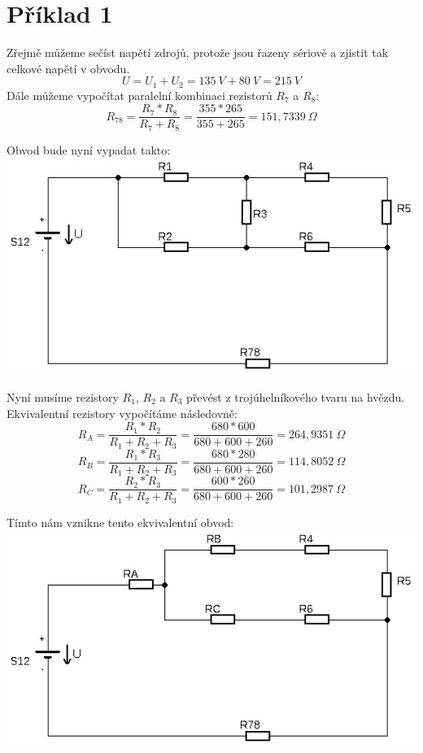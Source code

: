 \section{Příklad 1}

Zřejmě můžeme sečíst napětí zdrojů, protože jsou řazeny sériově a zjistit tak celkové napětí v obvodu.
{\large$$U = U_1 + U_2 = 135\:V + 80\:V = 215\:V$$}
Dále můžeme vypočítat paralelní kombinaci rezistorů $R_7$ a $R_8$: 
{\large$$R_{78} = \frac{R_7*R_8}{R_7 + R_8} = \frac{355*265}{355+265} = 151,7339\:\Omega$$}

Obvod bude nyní vypadat takto: \\

\includegraphics[totalheight=6cm]{fig/1_2.png}

\newpage
Nyní musíme rezistory $R_1$, $R_2$ a $R_3$ převést z trojúhelníkového tvaru na hvězdu. Ekvivalentní rezistory vypočítáme následovně:
{\large$$R_A = \frac{R_1*R_2}{R_1+R_2+R_3} = \frac{680 * 600}{680+600+260} = 264,9351\:\Omega$$}
{\large$$R_B = \frac{R_1*R_3}{R_1+R_2+R_3} = \frac{680*280}{680+600+260} = 114,8052\:\Omega$$}
{\large$$R_C = \frac{R_2*R_3}{R_1+R_2+R_3} = \frac{600*260}{680+600+260} = 101,2987\:\Omega$$}

Tímto nám vznikne tento ekvivalentní obvod: \\

\includegraphics[totalheight=6cm]{fig/1_3.png}

